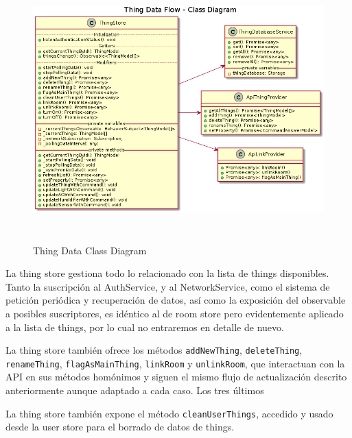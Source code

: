 \begin{figure}[hbt!]
\centering
\includegraphics[height=4in]{figures/diagrams/front/data-flow/thing.png}
\caption[thing]{Thing Data Class Diagram\footnotemark}
\end{figure}

\vspace{0.5cm}

La thing store gestiona todo lo relacionado con la lista de things disponibles. Tanto la suscripción al AuthService, y al NetworkService, como el sistema de petición periódica y recuperación de datos, así como la exposición del observable a posibles suscriptores, es idéntico al de room store pero evidentemente aplicado a la lista de things, por lo cual no entraremos en detalle de nuevo.

La thing store también ofrece los métodos \verb|addNewThing|, \verb|deleteThing|, \verb|renameThing|, \verb|flagAsMainThing|, \verb|linkRoom| y \verb|unlinkRoom|, que interactuan con la API en sus métodos homónimos y siguen el mismo flujo de actualización descrito anteriormente aunque adaptado a cada caso. Los tres últimos 

La thing store también expone el método \verb|cleanUserThings|, accedido y usado desde la user store para el borrado de datos de things.


